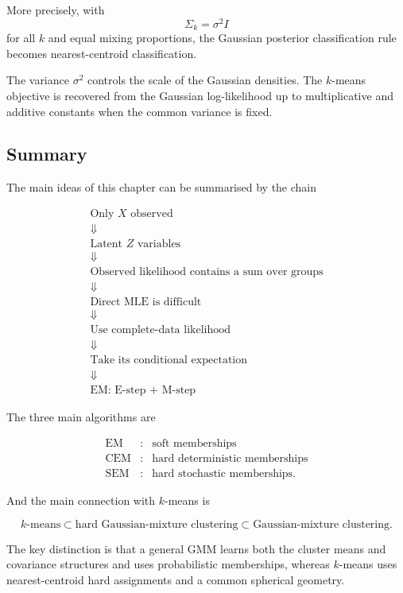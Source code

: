 More precisely, with
\[
\Sigma_k=\sigma^2I
\]
for all $k$ and equal mixing proportions, the Gaussian posterior
classification rule becomes nearest-centroid classification.

The variance $\sigma^2$ controls the scale of the Gaussian densities.
The $k$-means objective is recovered from the Gaussian log-likelihood
up to multiplicative and additive constants when the common variance
is fixed.

\subsection*{Summary}

The main ideas of this chapter can be summarised by the chain

\[
\boxed{
\begin{array}{c}
\text{Only }X\text{ observed}\\
\Downarrow\\
\text{Latent }Z\text{ variables}\\
\Downarrow\\
\text{Observed likelihood contains a sum over groups}\\
\Downarrow\\
\text{Direct MLE is difficult}\\
\Downarrow\\
\text{Use complete-data likelihood}\\
\Downarrow\\
\text{Take its conditional expectation}\\
\Downarrow\\
\text{EM: E-step + M-step}
\end{array}
}
\]

The three main algorithms are

\[
\boxed{
\begin{array}{lll}
\text{EM} &:& \text{soft memberships}\\
\text{CEM} &:& \text{hard deterministic memberships}\\
\text{SEM} &:& \text{hard stochastic memberships}.
\end{array}
}
\]

And the main connection with $k$-means is

\[
\boxed{
\text{$k$-means}
\subset
\text{hard Gaussian-mixture clustering}
\subset
\text{Gaussian-mixture clustering}.
}
\]

The key distinction is that a general GMM learns both the
cluster means and covariance structures and uses probabilistic
memberships, whereas $k$-means uses nearest-centroid hard assignments
and a common spherical geometry.